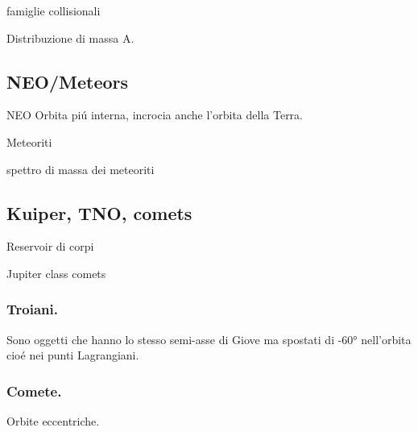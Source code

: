 \begin{wordonframe}{famiglie collisionali}

\end{wordonframe}

\begin{frame}{Distribuzione di massa A.}

\end{frame}


\subsection{NEO/Meteors}

\begin{frame}{NEO}
Orbita pi\'u interna, incrocia anche l'orbita della Terra.
\end{frame}

\begin{frame}{Meteoriti}

\end{frame}

\begin{wordonframe}{spettro di massa dei meteoriti}

\end{wordonframe}

\subsection{Kuiper, TNO, comets}

\begin{frame}{Reservoir di corpi}

\end{frame}

\begin{wordonframe}{Jupiter class comets}

\end{wordonframe}


\subsubsection{Troiani.}

Sono oggetti che hanno lo stesso semi-asse di Giove ma spostati di \ang{+-60} nell'orbita cio\'e nei punti Lagrangiani.

\subsubsection{Comete.}
Orbite eccentriche.

